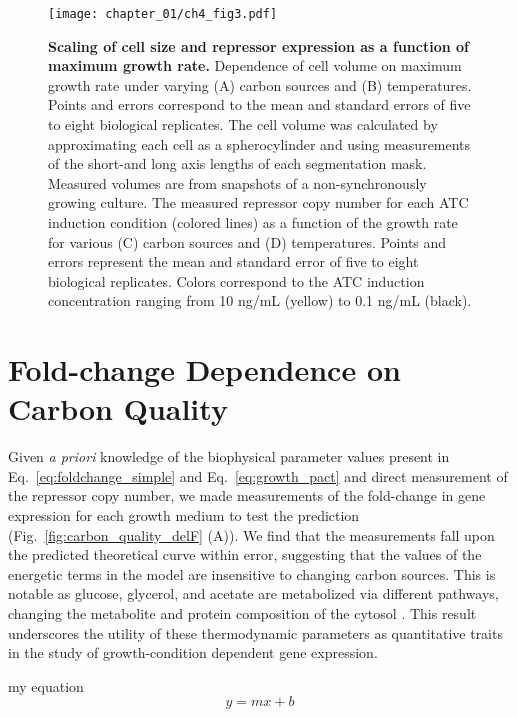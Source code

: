 \documentclass[12pt]{caltech_thesis}
\begin{document}
\hypertarget{fig:scaling}{%
\begin{figure}
\centering
\texttt{[image: chapter\_01/ch4\_fig3.pdf]}
\caption[{Scaling of cel size and repressor expression as a function of
maximum growth rate}]{\textbf{Scaling of cell size and repressor
expression as a function of maximum growth rate.} Dependence of cell
volume on maximum growth rate under varying (A) carbon sources and (B)
temperatures. Points and errors correspond to the mean and standard
errors of five to eight biological replicates. The cell volume was
calculated by approximating each cell as a spherocylinder and using
measurements of the short-and long axis lengths of each segmentation
mask. Measured volumes are from snapshots of a non-synchronously growing
culture. The measured repressor copy number for each ATC induction
condition (colored lines) as a function of the growth rate for various
(C) carbon sources and (D) temperatures. Points and errors represent the
mean and standard error of five to eight biological replicates. Colors
correspond to the ATC induction concentration ranging from 10 ng/mL
(yellow) to 0.1 ng/mL (black).}
\label{fig:scaling}
\end{figure}
}

\hypertarget{fold-change-dependence-on-carbon-quality}{%
\section{Fold-change Dependence on Carbon
Quality}\label{fold-change-dependence-on-carbon-quality}}

Given \emph{a priori} knowledge of the biophysical parameter values
\autocite{garcia2011,razo-mejia2018} present in
Eq.~\ref{eq:foldchange_simple} and Eq.~\ref{eq:growth_pact} and direct
measurement of the repressor copy number, we made measurements of the
fold-change in gene expression for each growth medium to test the
prediction (Fig.~\ref{fig:carbon_quality_delF} (A)). We find that the
measurements fall upon the predicted theoretical curve within error,
suggesting that the values of the energetic terms in the model are
insensitive to changing carbon sources. This is notable as glucose,
glycerol, and acetate are metabolized via different pathways, changing
the metabolite and protein composition of the cytosol
\autocite{martinez-gomez2012,kim2007}. This result underscores the
utility of these thermodynamic parameters as quantitative traits in the
study of growth-condition dependent gene expression.

my equation \[
y = mx + b
\]
\end{document}
